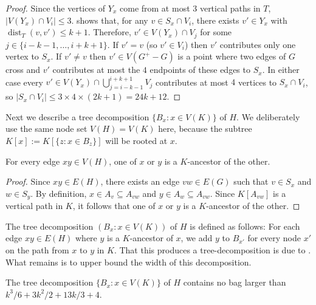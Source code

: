 \documentclass{patmorin}
\DeclareMathOperator{\dist}{dist}
\newcommand{\bagsize}{\ensuremath{k^3/6 + 3k^2/2 + 13k/3 + 4}}
\begin{document}
\begin{proof}
  Since the vertices of $Y_x$ come from at most 3 vertical paths in $T$, $|V(Y_x)\cap V_i|\le 3$.   shows that, for any $v\in S_x\cap V_i$, there exists $v'\in Y_x$ with $\dist_T(v,v')\le k+1$. Therefore, $v'\in V(Y_x)\cap V_{j}$ for some $j\in\{i-k-1,\ldots,i+k+1\}$.  If $v'=v$ (so $v'\in V_i$) then $v'$ contributes only one vertex to $S_x$.  If $v'\neq v$ then $v'\in V(G^+-G)$ is a point where two edges of $G$ cross and $v'$ contributes at most the $4$ endpoints of these edges to $S_x$. In either case every $v'\in V(Y_x)\cap \bigcup_{j=i-k-1}^{i+k+1} V_j$ contributes at most $4$ vertices to $S_x\cap V_i$, so $|S_x\cap V_i|\le 3\times 4\times (2k+1) = 24k+12$.
\end{proof}

Next we describe a tree decomposition $\{B_x:x\in V(K)\}$ of $H$.  We deliberately use the same node set $V(H)=V(K)$ here, because the subtree $K[x]:=K[\{z:x\in B_z\}]$ will be rooted at $x$.  

\begin{clm}
   For every edge $xy\in V(H)$, one of $x$ or $y$ is a $K$-ancestor of the other.
 \end{clm}
 
 \begin{proof}
   Since $xy\in E(H)$, there exists an edge $vw\in E(G)$ such that $v\in S_x$ and $w\in S_y$.  By definition, $x\in A_v\subseteq A_{vw}$ and $y\in A_w\subseteq A_{vw}$.  Since $K[A_{vw}]$ is a vertical path in $K$, it follows that one of $x$ or $y$ is a $K$-ancestor of the other. 
\end{proof}

The tree decomposition $(B_x:x\in V(K))$ of $H$ is defined as follows: For each edge $xy\in E(H)$ where $y$ is a $K$-ancestor of $x$, we add $y$ to $B_{x'}$ for every node $x'$ on the path from $x$ to $y$ in $K$.  That this produces a tree-decomposition is due to .  What remains is to upper bound the width of this decomposition.

\begin{clm}
  The tree decomposition $\{B_x: x\in V(K)\}$ of $H$ contains no bag larger than $\bagsize$.
\end{clm}
\end{document}
